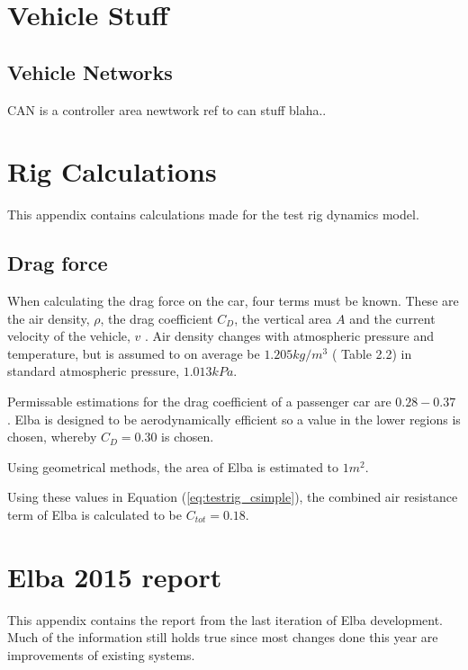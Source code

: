 \chapter{Vehicle Stuff} \label{appA}

\section{Vehicle Networks}
CAN is a controller area newtwork ref to can stuff blaha..

\chapter{Rig Calculations} \label{app:rigdata}
This appendix contains calculations made for the test rig dynamics model. 

\section*{Drag force}
When calculating the drag force on the car, four terms must be known.
These are the air density, $\rho$, the drag coefficient $C_D$, the vertical area
$A$ and the current velocity of the vehicle, $v$ \cite{nakayama2002}. Air
density changes with atmospheric pressure and temperature, but is assumed to on
average be $1.205\si{kg/m^3}$ (\cite{nakayama2002} Table 2.2) in standard
atmospheric pressure, $1.013\si{kPa}$. 

Permissable estimations for the drag coefficient of a passenger car are
$0.28-0.37$ \cite{nakayama2002}. Elba is designed to be aerodynamically
efficient so a value in the lower regions is chosen, whereby $C_D = 0.30$ is
chosen.

Using geometrical methods, the area of Elba is estimated to $1\si{m^2}$.

Using these values in Equation (\ref{eq:testrig_csimple}), the combined air
resistance term of Elba is calculated to be $C_{tot} = 0.18$.



\chapter{Elba 2015 report} \label{app:elba2015}
This appendix contains the report from the last iteration of Elba development.
Much of the information still holds true since most changes done this year are
improvements of existing systems.
%
